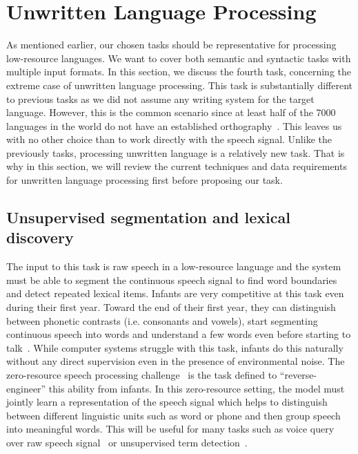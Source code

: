 \documentclass[12pt,twoside,final,hidelinks]{ltthesis}
\theoremstyle{definition}
\begin{document}
\section{Unwritten Language Processing}
As mentioned earlier, our chosen tasks should be representative for processing low-resource languages. 
We want to cover both semantic and syntactic tasks with multiple input formats. In this section, we discuss the fourth task, concerning the 
extreme case of unwritten language processing. This task is substantially different to previous tasks as we did not assume any writing system  for the target language. 
However, this is the common scenario since at least half of the 7000 languages in the world do not have an established orthography~\cite{lewis2009}. This leaves us with 
no other choice than to work directly with the speech signal. Unlike the previously tasks, processing unwritten language is a relatively new task. That is why 
in this section, we will review the current techniques and data requirements for unwritten language processing first before proposing our task. 

\subsection{Unsupervised segmentation and lexical discovery}
\label{sec:unsuperived_segmentation}
The input to this task is raw speech in a low-resource language and the system must 
be able to segment the continuous speech signal to find word boundaries and detect repeated lexical items.
Infants are very competitive at this task even during their first year. 
Toward the end of their first year, they can distinguish between phonetic contrasts (i.e. consonants and vowels), 
start segmenting continuous speech into words and understand a few words even before starting to talk~\cite{RaSaNen:2012:CMP:2318326.2318449}. 
While computer systems struggle with this task, infants do this naturally without any direct supervision even in the presence of environmental noise. 
The zero-resource speech processing challenge~\cite{Versteegh201667} is the task defined to ``reverse-engineer'' this ability from infants. 
In this zero-resource setting, the model must jointly learn a representation of the speech signal which helps to distinguish between different 
linguistic units such as word or phone and then group speech into meaningful words. This will be useful for many tasks such as 
voice query over raw speech signal~\cite{Park:2007:UPD:1329638} or unsupervised term detection~\cite{6163965}.
\end{document}
